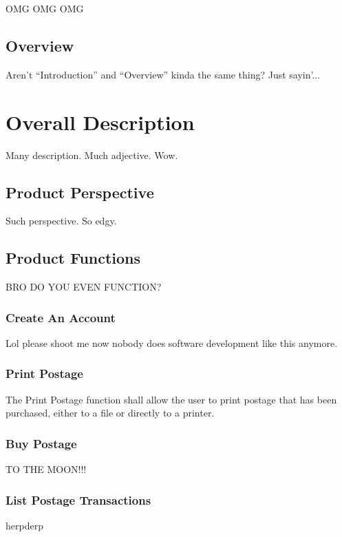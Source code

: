 \documentclass{scrreprt}
\begin{document}
OMG OMG OMG

\section{Overview}

Aren't ``Introduction'' and ``Overview'' kinda the same thing? Just sayin'...

\chapter{Overall Description}

Many description. Much adjective. Wow.

\section{Product Perspective}

Such perspective. So edgy.

\section{Product Functions}

BRO DO YOU EVEN FUNCTION?

\subsection{Create An Account}

Lol please shoot me now nobody does software development like this anymore.

\subsection{Print Postage}

The Print Postage function shall allow the user to print postage that has been 
purchased, either to a file or directly to a printer.

\subsection{Buy Postage}

TO THE MOON!!!

\subsection{List Postage Transactions}

herpderp
\end{document}
